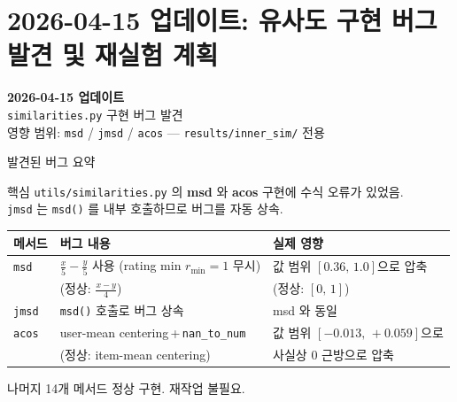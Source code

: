 \documentclass[aspectratio=169,10pt]{beamer}
\begin{document}
\section{2026-04-15 업데이트: 유사도 구현 버그 발견 및 재실험 계획}

\begin{frame}[plain]
	\begin{center}
		\vspace{1.8cm}
		{\LARGE \textbf{2026-04-15 업데이트}}\\[0.8em]
		{\large \texttt{similarities.py} 구현 버그 발견}\\[0.6em]
		{\normalsize 영향 범위: \texttt{msd} / \texttt{jmsd} / \texttt{acos} --- \texttt{results/inner\_sim/} 전용}
	\end{center}
\end{frame}

\begin{frame}{발견된 버그 요약}
	\begin{alertblock}{핵심}
		\texttt{utils/similarities.py} 의 \textbf{msd} 와 \textbf{acos} 구현에 수식 오류가 있었음.\\
		\texttt{jmsd} 는 \texttt{msd()} 를 내부 호출하므로 버그를 자동 상속.
	\end{alertblock}

	\vspace{0.5em}
	\renewcommand{\arraystretch}{1.4}
	\begin{tabular}{l|p{4.5cm}|p{4.7cm}}
		\toprule
		\textbf{메서드} & \textbf{버그 내용} & \textbf{실제 영향} \\
		\midrule
		\texttt{msd}
		  & $\displaystyle\frac{x}{5}-\frac{y}{5}$ 사용
		    \newline (rating min $r_{\min}=1$ 무시)
		  & 값 범위 $[0.36,\,1.0]$으로 압축\\
		  & (정상: $\displaystyle\frac{x-y}{4}$) & (정상: $[0,\,1]$) \\
		\midrule
		\texttt{jmsd}
		  & \texttt{msd()} 호출로 버그 상속
		  & msd 와 동일 \\
		\midrule
		\texttt{acos}
		  & user-mean centering\,+\,\texttt{nan\_to\_num}
		  & 값 범위 $[-0.013,\,+0.059]$으로 \\
		  & (정상: item-mean centering)  & 사실상 $0$ 근방으로 압축 \\
		\bottomrule
	\end{tabular}

	\vspace{0.4em}
	\begin{block}{나머지 14개 메서드}
		정상 구현. 재작업 불필요.
	\end{block}
\end{frame}
\end{document}
